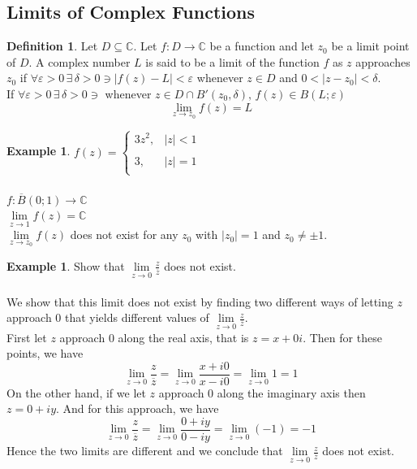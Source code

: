 \documentclass[11pt,a4paper]{article}
\theoremstyle{definition}
\newtheorem{definition}[thm]{Definition}
\newtheorem{example}[thm]{Example}
\begin{document}
{\color[wave]{485}\subsection{Limits of Complex Functions}}

\begin{definition}
Let $D\subseteq \mathbb{C}$. Let $f: D\longrightarrow \mathbb{C}$ be a function and let $z_0$ be a limit point of $D$. A complex number $L$ is said to be a limit of the function $f$ as $z$ approaches $z_0$ if $\forall \varepsilon > 0 \,\exists\, \delta > 0 \ni \left|f(z) - L\right|  < \varepsilon$ whenever $z\in D$ and $0 < \left|z - z_0\right| < \delta$.\\




If $\forall \varepsilon > 0 \,\exists\, \delta > 0 \ni$ whenever $z \in D \cap B'(z_0,\delta), \, f(z) \in B(L;\varepsilon)$
$$\lim\limits_{z \rightarrow z_0} f(z) = L$$
\end{definition}

\begin{example}

$f(z) = \begin{cases}
3z^2, & \left|z\right| < 1\\\\
3, & \left|z\right|= 1\\
\end{cases}$\\\\

$f: \overline{B}(0;1) \longrightarrow \mathbb{C}$\\

$\lim\limits_{z \rightarrow 1} f(z)  = \mathbb{C}$\\

$\lim\limits_{z \rightarrow z_0} f(z)$ does not exist for any $z_0$ with $\left|z_0\right| = 1$ and $z_0 \neq \pm 1$.
\end{example}

\begin{example}
Show that $\lim\limits_{z \rightarrow 0}\frac{z}{\overline{z}}$ does not exist.\\



\text{\textcolor{red}{Solution}}\\
We show that this limit does not exist by finding two different ways of letting $z$ approach 0 that yields different values of $\lim\limits_{z \rightarrow 0}\frac{z}{\overline{z}}$.\\
First let $z$ approach  0 along the real axis, that is $z = x + 0i$. Then for these points, we have  
$$\lim\limits_{z \rightarrow 0}\frac{z}{\overline{z}}= \lim\limits_{z \rightarrow 0}\frac{x + i0}{x - i0} = \lim\limits_{z \rightarrow 0} 1 = 1$$
On the other hand, if we let $z$ approach 0 along the imaginary axis then $z = 0  + iy$. And for this approach, we have  
$$\lim\limits_{z \rightarrow 0}\frac{z}{\overline{z}} = \lim\limits_{z \rightarrow 0}\frac{0 + iy}{0 - iy} = \lim\limits_{z \rightarrow 0} (-1) = -1$$ 
Hence the two limits are different and we conclude that $\lim\limits_{z \rightarrow 0}\frac{z}{\overline{z}}$ does not exist.
\end{example}
\end{document}
